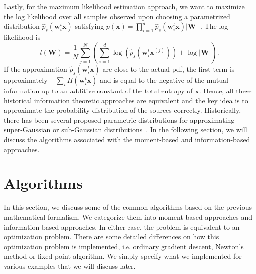 \documentclass[aps,prl,preprint,superscriptaddress]{revtex4-2}
\begin{document}
Lastly, for the maximum likelihood estimation approach, we want to maximize the log likelihood over all samples observed upon choosing a parametrized distribution $\hat{p}_{s}(\mathbf{w}_{i}^t\mathbf{x})$ satisfying $p(\mathbf{x}) = \prod_{i=1}^{d}\hat{p}_{s}(\mathbf{w}_{i}^t\mathbf{x})|\mathbf{W}|$ \cite{ng_cs229}. The log-likelihood is
\begin{equation}
l(\mathbf{W}) = \frac{1}{N}\sum_{j=1}^{N} \left(\sum_{i=1}^{d}\log(\hat{p}_{s}(\mathbf{w}_{i}^t\mathbf{x}^{(j)}))+\log|\mathbf{W}|\right).
\end{equation}
If the approximation $\hat{p}_{s}(\mathbf{w}_{i}^t\mathbf{x})$ are close to the actual pdf, the first term is approximately $-\sum_{i}H(\mathbf{w}_{i}^t\mathbf{x})$ and is equal to the negative of the mutual information up to an additive constant of the total entropy of $\mathbf{x}$. Hence, all these historical information theoretic approaches are equivalent and the key idea is to approximate the probability distribution of the sources correctly. Historically, there has been several proposed parametric distributions for approximating super-Gaussian or sub-Gaussian distributions~\cite{lee1998independent}. In the following section, we will discuss the algorithms associated with the moment-based and information-based approaches.

\section{Algorithms}
In this section, we discuss some of the common algorithms based on the previous mathematical formalism. We categorize them into moment-based approaches and information-based approaches. In either case, the problem is equivalent to an optimization problem. There are some detailed differences on how this optimization problem is implemented, i.e. ordinary gradient descent, Newton's method or fixed point algorithm. We simply specify what we implemented for various examples that we will discuss later.
\end{document}
